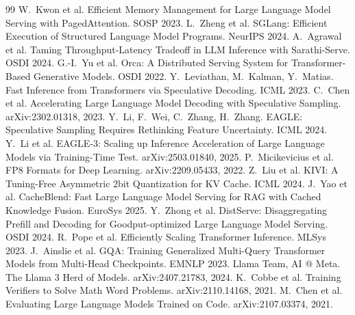 \documentclass[10pt,a4paper]{article}
\begin{document}
\begingroup
\small
\renewcommand{\section}[2]{\vspace{1ex}\noindent{\sffamily\large\bfseries\color{accent}References}\par\vspace{0.3ex}}
\begin{thebibliography}{99}
\setlength{\itemsep}{1pt}
 W.~Kwon et al. Efficient Memory Management for Large Language Model Serving with PagedAttention. SOSP 2023.
 L.~Zheng et al. SGLang: Efficient Execution of Structured Language Model Programs. NeurIPS 2024.
 A.~Agrawal et al. Taming Throughput-Latency Tradeoff in LLM Inference with Sarathi-Serve. OSDI 2024.
 G.-I.~Yu et al. Orca: A Distributed Serving System for Transformer-Based Generative Models. OSDI 2022.
 Y.~Leviathan, M.~Kalman, Y.~Matias. Fast Inference from Transformers via Speculative Decoding. ICML 2023.
 C.~Chen et al. Accelerating Large Language Model Decoding with Speculative Sampling. arXiv:2302.01318, 2023.
 Y.~Li, F.~Wei, C.~Zhang, H.~Zhang. EAGLE: Speculative Sampling Requires Rethinking Feature Uncertainty. ICML 2024.
 Y.~Li et al. EAGLE-3: Scaling up Inference Acceleration of Large Language Models via Training-Time Test. arXiv:2503.01840, 2025.
 P.~Micikevicius et al. FP8 Formats for Deep Learning. arXiv:2209.05433, 2022.
 Z.~Liu et al. KIVI: A Tuning-Free Asymmetric 2bit Quantization for KV Cache. ICML 2024.
 J.~Yao et al. CacheBlend: Fast Large Language Model Serving for RAG with Cached Knowledge Fusion. EuroSys 2025.
 Y.~Zhong et al. DistServe: Disaggregating Prefill and Decoding for Goodput-optimized Large Language Model Serving. OSDI 2024.
 R.~Pope et al. Efficiently Scaling Transformer Inference. MLSys 2023.
 J.~Ainslie et al. GQA: Training Generalized Multi-Query Transformer Models from Multi-Head Checkpoints. EMNLP 2023.
 Llama Team, AI @ Meta. The Llama 3 Herd of Models. arXiv:2407.21783, 2024.
 K.~Cobbe et al. Training Verifiers to Solve Math Word Problems. arXiv:2110.14168, 2021.
 M.~Chen et al. Evaluating Large Language Models Trained on Code. arXiv:2107.03374, 2021.

\end{thebibliography}
\end{document}
